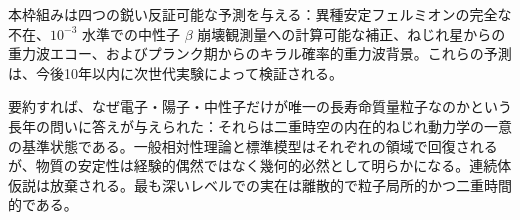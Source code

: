 \documentclass[a4paper]{article}
\begin{document}
本枠組みは四つの鋭い反証可能な予測を与える：異種安定フェルミオンの完全な不在、\(10^{-3}\) 水準での中性子 \(\beta\) 崩壊観測量への計算可能な補正、ねじれ星からの重力波エコー、およびプランク期からのキラル確率的重力波背景。これらの予測は、今後10年以内に次世代実験によって検証される。

要約すれば、なぜ電子・陽子・中性子だけが唯一の長寿命質量粒子なのかという長年の問いに答えが与えられた：それらは二重時空の内在的ねじれ動力学の一意の基準状態である。一般相対性理論と標準模型はそれぞれの領域で回復されるが、物質の安定性は経験的偶然ではなく幾何的必然として明らかになる。連続体仮説は放棄される。最も深いレベルでの実在は離散的で粒子局所的かつ二重時間的である。
\end{document}
